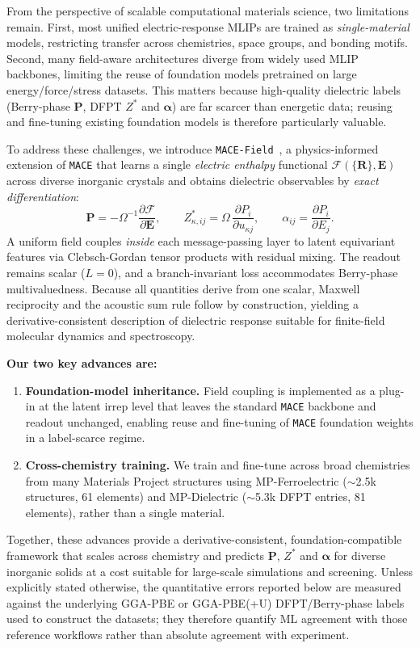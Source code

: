 \documentclass[aps,physrev,graphicx,amsmath,amssymb,
               reprint,superscriptaddress]{revtex4-2}
\begin{document}
From the perspective of scalable computational materials science, two limitations remain. First, most unified electric-response MLIPs are trained as \emph{single-material} models, restricting transfer across chemistries, space groups, and bonding motifs. Second, many field-aware architectures diverge from widely used MLIP backbones, limiting the reuse of foundation models pretrained on large energy/force/stress datasets. This matters because high-quality dielectric labels (Berry-phase $\mathbf P$, DFPT $Z^*$ and $\boldsymbol\alpha$) are far scarcer than energetic data; reusing and fine-tuning existing foundation models is therefore particularly valuable.

To address these challenges, we introduce \texttt{MACE-Field}~\cite{mdi_group_mace_field}, a physics-informed extension of \texttt{MACE} that learns a single \emph{electric enthalpy} functional $\mathcal F(\{\mathbf R\},\mathbf E)$ across diverse inorganic crystals and obtains dielectric observables by \emph{exact differentiation}:
\begin{equation}
\mathbf P=-\Omega^{-1}\frac{\partial \mathcal F}{\partial \mathbf E},\qquad
Z^*_{\kappa,ij}=\Omega\,\frac{\partial P_i}{\partial u_{\kappa j}},\qquad
\alpha_{ij}=\frac{\partial P_i}{\partial E_j}.
\end{equation}
A uniform field couples \emph{inside} each message-passing layer to latent equivariant features via Clebsch-Gordan tensor products with residual mixing. The readout remains scalar ($L{=}0$), and a branch-invariant loss accommodates Berry-phase multivaluedness. Because all quantities derive from one scalar, Maxwell reciprocity and the acoustic sum rule follow by construction, yielding a derivative-consistent description of dielectric response suitable for finite-field molecular dynamics and spectroscopy.

\textbf{Our two key advances are:}
\begin{enumerate}
  \item \textbf{Foundation-model inheritance.} Field coupling is implemented as a plug-in at the latent irrep level that leaves the standard \texttt{MACE} backbone and readout unchanged, enabling reuse and fine-tuning of \texttt{MACE} foundation weights in a label-scarce regime.
  \item \textbf{Cross-chemistry training.} We train and fine-tune across broad chemistries from many Materials Project structures using MP-Ferroelectric ($\sim$2.5k structures, 61 elements) and MP-Dielectric ($\sim$5.3k DFPT entries, 81 elements), rather than a single material.
\end{enumerate}
Together, these advances provide a derivative-consistent, foundation-compatible framework that scales across chemistry and predicts $\mathbf P$, $Z^*$ and $\boldsymbol\alpha$ for diverse inorganic solids at a cost suitable for large-scale simulations and screening. Unless explicitly stated otherwise, the quantitative errors reported below are measured against the underlying GGA-PBE or GGA-PBE(+U) DFPT/Berry-phase labels used to construct the datasets; they therefore quantify ML agreement with those reference workflows rather than absolute agreement with experiment.
\end{document}
